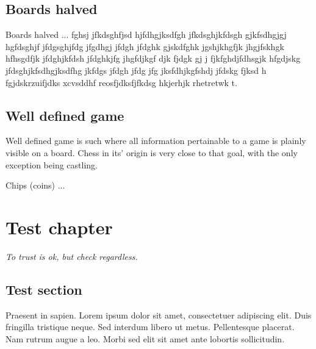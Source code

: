 \documentclass[a5paper,12pt,draft]{book} %
\begin{document}
\section*{Boards halved}

\indent
Boards halved ... fghsj jfkdsghfjsd hjfdhgjksdfgh jfkdsghjkfdsgh gjkfsdhgjgj
hgfdsghjf jfdgsghjfdg jfgdhgj jfdgh jfdghk gjskdfghk jgshjkhgfjk jhgjfskhgk
hfhsgdfjk jfdghjkfdsh jfdghkjfg jhgfdjkgf djk fjdgk gj j fjkfghdjfdhsgjk
hfgdjskg jfdsghjkfsdhgjksdfhg jkfdgs jfdgh jfdg jfg jksfdhjkgfshdj jfdskg
fjksd h fgjdskrzuifjdks xcvsddhf reosfjdksfjfkdsg hkjerhjk rhetretwk t.

\section*{Well defined game}

\hspace*{\fill}Well defined game is such where all information pertainable to a game
is plainly visible on a board. Chess in its' origin is very close to
that goal, with the only exception being castling.

Chips (coins) ...

\clearpage

\chapter*{Test chapter}

\begin{flushright}
\parbox{0.6\textwidth}{
\emph{To trust is ok, but check regardless. \\
 } }
\end{flushright}

\section*{Test section}

Praesent in sapien. Lorem ipsum dolor sit amet, consectetuer adipiscing elit.
Duis fringilla tristique neque. Sed interdum libero ut metus. Pellentesque placerat.
Nam rutrum augue a leo. Morbi sed elit sit amet ante lobortis sollicitudin.
\end{document}
